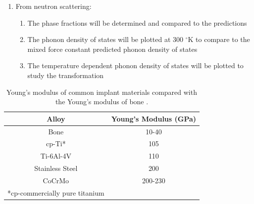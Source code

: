 \begin{enumerate}
\begin{enumerate}
\begin{enumerate}
		\end{enumerate}
		\item From neutron scattering:
		\begin{enumerate}
			\item The phase fractions will be determined and compared to the predictions
			\item The phonon density of states will be plotted at 300 $^\circ$K to compare to the mixed force constant predicted phonon density of states 
			\item The temperature dependent phonon density of states will be plotted to study the transformation 
		\end{enumerate}
	\end{enumerate} 
\end{enumerate}
				
\pagebreak
\begin{table}[H]
	\caption{Young's modulus of common implant materials compared with the Young's modulus of bone \cite{Long1998a}.}
	\centering
	\begin{tabular}{ c c }
		\hline
		Alloy & Young's Modulus (GPa) \\
		\hline
		Bone & 10-40\\
		cp-Ti* & 105\\
		Ti-6Al-4V & 110\\
		Stainless Steel & 200\\
		CoCrMo & 200-230\\
		\hline
		*cp-commercially pure titanium 
	\end{tabular}
\label{table:commonEM}
\end{table}
\clearpage

